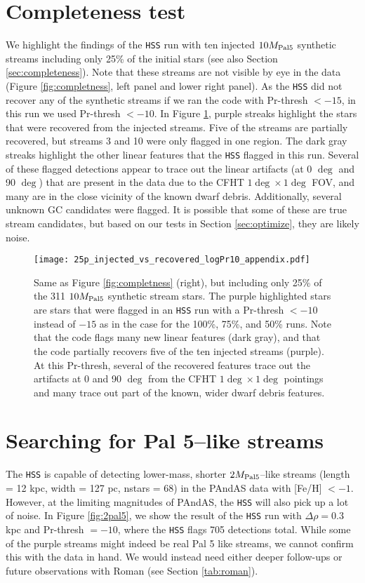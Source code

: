 \documentclass[twocolumn]{aastex631}
\begin{document}
\section{Completeness test}\label{sec:appendix_completeness}
We highlight the findings of the \texttt{HSS} run with ten injected $10{M}_{\rm Pal 5}$ synthetic streams including only 25\% of the initial stars (see also Section \ref{sec:completeness}). Note that these streams are not visible by eye in the data (Figure \ref{fig:completness}, left panel and lower right panel). As the \texttt{HSS} did not recover any of the synthetic streams if we ran the code with Pr-thresh $<-15$, in this run we used Pr-thresh $<-10$. In Figure \ref{fig:completness_logPr10_25p}, purple streaks highlight the stars that were recovered from the injected streams. Five of the streams are partially recovered, but streams 3 and 10 were only flagged in one region. The dark gray streaks highlight the other linear features that the \texttt{HSS} flagged in this run. Several of these flagged detections appear to trace out the linear artifacts (at 0 $\deg$ and 90 $\deg$) that are present in the data due to the CFHT $1\deg \times1\deg$ FOV, and many are in the close vicinity of the known dwarf debris. Additionally, several unknown GC candidates were flagged. It is possible that some of these are true stream candidates, but based on our tests in Section \ref{sec:optimize}, they are likely noise.


\begin{figure*}
\centerline{\texttt{[image: 25p\_injected\_vs\_recovered\_logPr10\_appendix.pdf]}}
\caption{Same as Figure \ref{fig:completness} (right), but including only 25\% of the 311 $10{M}_{\rm Pal 5}$ synthetic stream stars. The purple highlighted stars are stars that were flagged in an \texttt{HSS} run with a Pr-thresh $<-10$ instead of $-15$ as in the case for the 100\%, 75\%, and 50\% runs. Note that the code flags many new linear features (dark gray), and that the code partially recovers five of the ten injected streams (purple). At this Pr-thresh, several of the recovered features trace out the artifacts at 0 and 90 $\deg$ from the CFHT $1\deg \times1\deg$ pointings and many trace out part of the known, wider dwarf debris features.}
\label{fig:completness_logPr10_25p}
\end{figure*}

\section{Searching for Pal 5--like streams}\label{sec:appendix_pal5}
The \texttt{HSS} is capable of detecting lower-mass, shorter $2 {M}_{\rm Pal 5}$--like streams (length = 12 kpc, width = 127 pc, nstars = 68) in the PAndAS data with [Fe/H] $<-1$. However, at the limiting magnitudes of PAndAS, the \texttt{HSS} will also pick up a lot of noise. In Figure \ref{fig:2pal5}, we show the result of the \texttt{HSS} run with $\Delta\rho = 0.3$ kpc and Pr-thresh $= -10$, where the \texttt{HSS} flags 705 detections total. While some of the purple streams might indeed be real Pal 5 like streams, we cannot confirm this with the data in hand. We would instead need either deeper follow-ups or future observations with Roman (see Section \ref{tab:roman}). 
\end{document}
